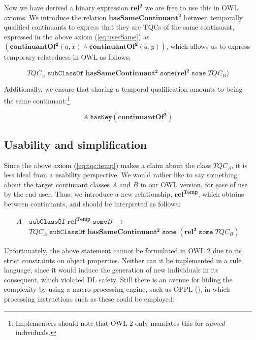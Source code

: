 \documentclass[10pt]{bmc_article}
\newcommand{\mirel}[1]{\ensuremath{\mathrm{\mathbf{#1}}}}
\newcommand{\mclass}[1]{\ensuremath{\mathit{#1}}}
\newcommand{\mrel}[2]{\mirel{#1^#2}}
\newcommand{\mrelb}[1]{\mrel{#1}{2}}
\newcommand{\TQC}[1]{\ensuremath{TQC_{\mclass{#1}}}}
\newcommand{\mreltemp}[1]{\mrel{#1}{{Temp}}}
\newenvironment{bmcformat}{\baselineskip20pt\sloppy\setboolean{publ}{false}}{\baselineskip20pt\sloppy}
\begin{document}
\begin{bmcformat}
Now we have derived a binary expression \mrelb{rel} we are free to use this in OWL
axioms. We introduce the relation \mrelb{hasSameContinuant} between temporally qualified
continuants to express that they are TQCs of the same continuant,
expressed in the above axiom (\ref{eq:usesSame}) as $(\mrelb{continuantOf}(a,x)
\wedge \mrelb{continuantOf}(a,y))$, which allows us to express temporary relatedness in OWL as follows:

\begin{equation}
\TQC{A}\;\mathtt{subClassOf}\;\mrelb{hasSameContinuant}\;\mathtt{some
(}\mrelb{rel}\;\mathtt{some}\;\TQC{B}) 
\label{eq:tqc:temp}
\end{equation}

Additionally, we ensure that sharing a temporal qualification amounts to being
the same continuant:\footnote{Implementers should note that OWL 2 only mandates
this for \emph{named} individuals.}

\begin{equation}
\mclass{A}\;\mathtt{hasKey}(\mrelb{continuantOf})
\end{equation}

\subsection*{Usability and simplification}
Since the above axiom (\ref{eq:tqc:temp}) makes a claim about the class \TQC{A},
it is less ideal from a usability perspective. We would rather like to say
something about the target continuant classes \mclass{A} and \mclass{B} in our OWL version, for
ease of use by the end user. Thus, we introduce a new relationship,
\mreltemp{rel}, which obtains between continuants, and should be interpreted as follows:


\begin{equation}
\begin{split}
\mclass{A}\;&\mathtt{subClassOf}\;\mreltemp{rel}\;\mathtt{some}\mclass{B}\;\rightarrow\\
&\TQC{A}\;\mathtt{subClassOf}\;\mrelb{hasSameContinuant}\;\mathtt{some}\;(\mrelb{rel}\;\mathtt{some}\;
\TQC{B}) 
\end{split}
\end{equation}

Unfortunately, the above statement cannot be formulated in OWL 2 due to its
strict constraints on object properties. Neither can it be implemented in a
rule language, since it would induce the generation of new individuals in its
consequent, which violated DL safety. Still there is an avenue for hiding the
complexity by using a macro processing engine, such as OPPL (\cite{OPPL}), in
which processing instructions such as these could be employed:


\end{bmcformat}
\end{document}
